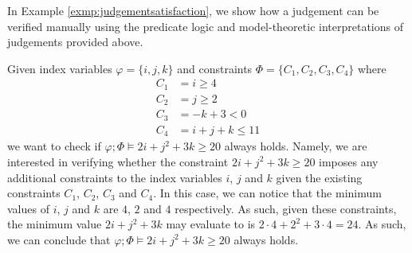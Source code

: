 In Example \ref{exmp:judgementsatisfaction}, we show how a judgement can be verified manually using the predicate logic and model-theoretic interpretations of judgements provided above.
%
\begin{examp}\label{exmp:judgementsatisfaction}
    Given index variables $\varphi = \{i, j, k\}$ and constraints $\Phi = \{C_1, C_2, C_3, C_4\}$ where
    \begin{align*}
        C_1 &= i \geq 4\\
        C_2 &= j \geq 2\\
        C_3 &= -k + 3 < 0\\ %
        C_4 &= i + j + k \leq 11
    \end{align*}
    we want to check if $\varphi; \Phi \vDash 2i + j^2 + 3k \geq 20$ always holds. %
    Namely, we are interested in verifying whether the constraint $2i + j^2 + 3k \geq 20$ imposes any additional constraints to the index variables $i$, $j$ and $k$ given the existing constraints $C_1$, $C_2$, $C_3$ and $C_4$. In this case, we can notice that the minimum values of $i$, $j$ and $k$ are $4$, $2$ and $4$ respectively. As such, given these constraints, the minimum value $2i + j^2 + 3k$ may evaluate to is $2 \cdot 4 + 2^2 + 3 \cdot 4 = 24$. As such, we can conclude that $\varphi; \Phi \vDash 2i + j^2 + 3k \geq 20$ always holds.\\
    

\end{examp}

